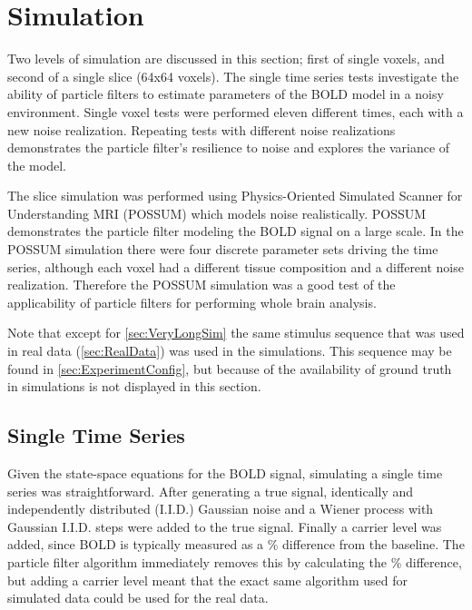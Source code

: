 \chapter{Simulation}
\label{sec:SimulationResults}
Two levels of simulation are discussed in this section; first of single voxels,
and second of a single slice (64x64 voxels).  The single time series tests
investigate the ability of particle filters to estimate parameters of the \ac{BOLD} model
in a noisy environment. Single voxel tests were
performed eleven different times, each with a new noise realization.
Repeating tests with different noise realizations demonstrates the
particle filter's resilience to noise and explores the variance of
the model.

The slice simulation was performed using
Physics-Oriented Simulated Scanner for Understanding MRI (POSSUM) which
models noise realistically. POSSUM demonstrates the
particle filter modeling the \ac{BOLD} signal on a large scale.
In the POSSUM simulation there were four
discrete parameter sets driving the time series, although each voxel had a
different tissue composition and a different
noise realization. Therefore the POSSUM simulation was
a good test of the applicability of particle filters for performing
whole brain analysis.

Note that except for \autoref{sec:VeryLongSim} the same stimulus sequence
that was used in real data (\autoref{sec:RealData}) was used in the simulations. This sequence may
be found in \autoref{sec:ExperimentConfig}, but because of the availability of ground
truth in simulations is not displayed in this section.

\section{Single Time Series}
\label{sec:Single Voxel Simulation}
Given the state-space equations for the \ac{BOLD} signal, simulating a single time
series was straightforward. After generating a true signal,
identically and independently distributed (I.I.D.) Gaussian noise and a Wiener
process with Gaussian I.I.D. steps were added to the true signal. Finally a
carrier level was added, since \ac{BOLD} is typically
measured as a \% difference from the baseline. The particle filter
algorithm immediately removes this by calculating the \% difference,
but adding a carrier level meant that the exact same algorithm used
for simulated data could be used for the real data.

